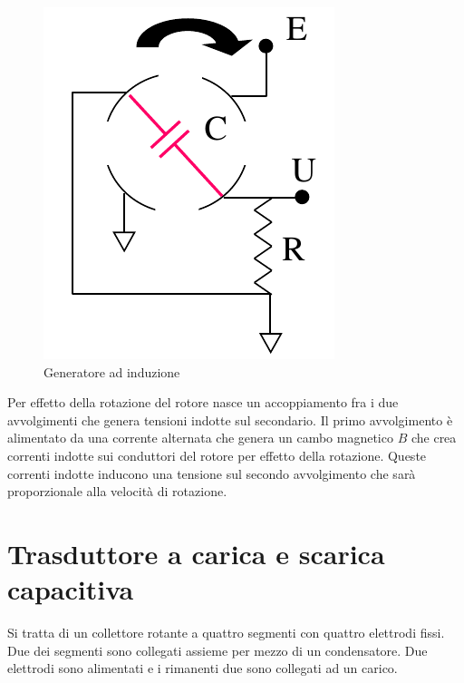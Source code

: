 \begin{figure}[htbp]
	\centering
	\includegraphics[scale=0.5]
			{img/caricascaricacapacitiva.png}
	\caption{Generatore ad induzione\label{fig:genind}}
\end{figure}

Per effetto della rotazione del rotore nasce un accoppiamento fra i
due avvolgimenti che genera tensioni indotte sul secondario. Il primo
avvolgimento è alimentato da una corrente alternata che genera un
cambo magnetico $B$ che crea correnti indotte sui conduttori del
rotore per effetto della rotazione. Queste correnti indotte inducono
una tensione sul secondo avvolgimento che sarà proporzionale alla
velocità di rotazione.


\section{Trasduttore a carica e scarica capacitiva}
Si tratta di un collettore rotante a quattro segmenti con quattro
elettrodi fissi. Due dei segmenti sono collegati assieme per mezzo di
un condensatore. Due elettrodi sono alimentati e i rimanenti due sono
collegati ad un carico.

